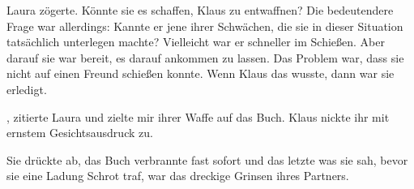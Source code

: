 \par

Laura zögerte. Könnte sie es schaffen, Klaus zu entwaffnen? Die bedeutendere Frage war allerdings: Kannte er jene ihrer Schwächen, die sie in dieser Situation tatsächlich unterlegen machte? Vielleicht war er schneller im Schießen. Aber darauf sie war bereit, es darauf ankommen zu lassen. Das Problem war, dass sie nicht auf einen Freund schießen konnte. Wenn Klaus das wusste, dann war sie erledigt.

\par

, zitierte Laura und zielte mir ihrer Waffe auf das Buch. Klaus nickte ihr mit ernstem Gesichtsausdruck zu.

\par

Sie drückte ab, das Buch verbrannte fast sofort und das letzte was sie sah, bevor sie eine Ladung Schrot traf, war das dreckige Grinsen ihres Partners.
